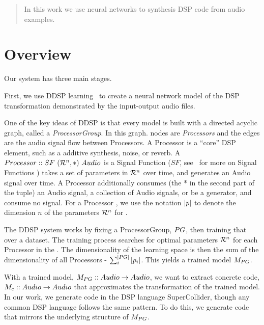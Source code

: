 \documentclass[12pt]{article}
\begin{document}
\maketitle

\begin{abstract}
In this work we use neural networks to synthesis DSP code from audio examples.
\end{abstract}

\section{Overview}

Our system has three main stages.

First, we use DDSP learning~\cite{} to create a neural network model of the DSP transformation demonstrated by the input-output audio files.

One of the key ideas of DDSP is that every model is built with a directed acyclic graph, called a \textit{ProcessorGroup}.
In this graph. nodes are \textit{Processors} and the edges are the audio signal flow between Processors.
A Processor is a ``core'' DSP element, such as a additive synthesis, noise, or reverb.
A $Processor :: SF\ (\mathcal{R}^n, *)\ Audio$ is a Signal Function ($SF$, see~\cite{nilsson2002functional} for more on Signal Functions ) takes a set of parameters in $\mathcal{R}^n$ over time, and generates an Audio signal over time.
A Processor additionally consumes (the * in the second part of the tuple) an Audio signal, a collection of Audio signals, or be a generator, and consume no signal.
For a Processor \processor, we use the notation $|p|$ to denote the dimension $n$ of the parameters $\mathcal{R}^n$ for \processor.

The DDSP system works by fixing a ProcessorGroup, $PG$, then training that over a dataset.
The training process searches for optimal parameters $\mathcal{R}^n$ for each Processor in the \processorGroup.
The dimensionality of the learning space  is then the sum of the dimensionality of all Processors - $\sum_{i}^{|PG|} |p_i|$.
This yields a trained model $M_{PG}$.


With a trained model, $M_{PG} :: Audio \to Audio$, we want to extract concrete code, $M_c :: Audio \to Audio$ that approximates the transformation of the trained model.
In our work, we generate code in the DSP language SuperCollider, though any common DSP language follows the same pattern.
To do this, we generate code that mirrors the underlying structure of $M_{PG}$.
\end{document}
